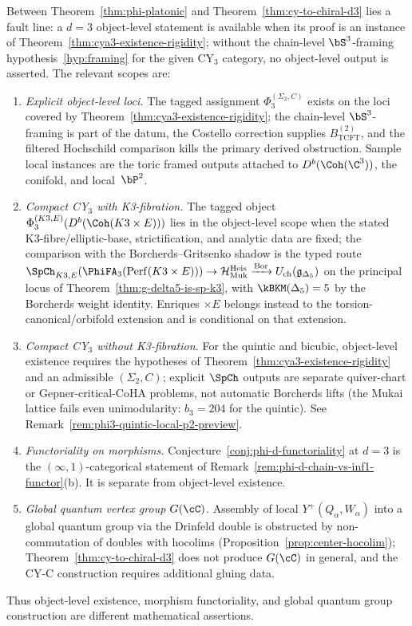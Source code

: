 \begin{remark}
\label{rem:cya3-conjecture-stratification-S1-S5}
Between Theorem~\ref{thm:phi-platonic} and Theorem~\ref{thm:cy-to-chiral-d3} lies a fault line: a $d = 3$ object-level statement is available when its proof is an instance of Theorem~\ref{thm:cya3-existence-rigidity}; without the chain-level $\bS^3$-framing hypothesis~\ref{hyp:framing} for the given CY$_3$ category, no object-level output is asserted. The relevant scopes are:
\begin{enumerate}[label=\textup{(\roman*)}]
 \item \emph{Explicit object-level loci.} The tagged assignment $\Phi_3^{(\Sigma_2,C)}$ exists on the loci covered by Theorem~\ref{thm:cya3-existence-rigidity}; the chain-level $\bS^3$-framing is part of the datum, the Costello correction supplies $B^{(2)}_{\mathrm{TCFT}}$, and the filtered Hochschild comparison kills the primary derived obstruction. Sample local instances are the toric framed outputs attached to $D^b(\Coh(\C^3))$, the conifold, and local~$\bP^2$.
 \item \emph{Compact CY$_3$ with K3-fibration.} The tagged object $\Phi_3^{(K3,E)}(D^b(\Coh(K3 \times E)))$ lies in the object-level scope when the stated K3-fibre/elliptic-base, strictification, and analytic data are fixed; the comparison with the Borcherds--Gritsenko shadow is the typed route
 $\SpCh_{K3,E}(\PhiFA_3(\mathrm{Perf}(K3 \times E))) \to \mathcal H_{\mathrm{Muk}}^{\mathrm{Heis}} \xrightarrow{\mathrm{Bor}} U_{\mathrm{ch}}(\mathfrak{g}_{\Delta_5})$
 on the principal locus of Theorem~\ref{thm:g-delta5-is-sp-k3}, with $\kBKM(\Delta_5) = 5$ by the Borcherds weight identity. Enriques $\times E$ belongs instead to the torsion-canonical/orbifold extension and is conditional on that extension.
 \item \emph{Compact CY$_3$ without K3-fibration.} For the quintic and bicubic, object-level existence requires the hypotheses of Theorem~\ref{thm:cya3-existence-rigidity} and an admissible $(\Sigma_2,C)$; explicit $\SpCh$ outputs are separate quiver-chart or Gepner-critical-CoHA problems, not automatic Borcherds lifts \textup{(}the Mukai lattice fails even unimodularity: $b_3 = 204$ for the quintic\textup{).} See Remark~\ref{rem:phi3-quintic-local-p2-preview}.
 \item \emph{Functoriality on morphisms.} Conjecture~\ref{conj:phi-d-functoriality} at $d = 3$ is the $(\infty,1)$-categorical statement of Remark~\ref{rem:phi-d-chain-vs-inf1-functor}\textup{(b)}. It is separate from object-level existence.
 \item \emph{Global quantum vertex group $G(\cC)$.} Assembly of local $Y^+(Q_\alpha, W_\alpha)$ into a global quantum group via the Drinfeld double is obstructed by non-commutation of doubles with hocolims \textup{(}Proposition~\ref{prop:center-hocolim}\textup{);} Theorem~\ref{thm:cy-to-chiral-d3} does not produce $G(\cC)$ in general, and the CY-C construction requires additional gluing data.
\end{enumerate}
Thus object-level existence, morphism functoriality, and global quantum
group construction are different mathematical assertions.
\end{remark}

